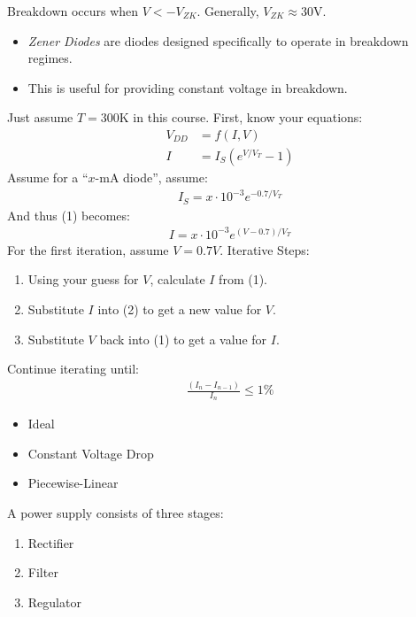 \documentclass{article}
\begin{document}
 Breakdown occurs when $V < -V_{ZK}$. Generally,
$V_{ZK} \approx 30$V.
\begin{itemize}
\item \textit{Zener Diodes} are diodes designed specifically to operate in breakdown
  regimes.
\item This is useful for providing constant voltage in breakdown.
\end{itemize}
 Just assume $T = 300$K in this course.
\gap
{}
First, know your equations:
\begin{align}
  V_{DD} &= f(I, V)\\
  I &= I_S(e^{V/V_T} - 1)
\end{align}
Assume for a ``$x$-mA diode'', assume:
\begin{align*}
  I_S = x \cdot 10^{-3} e^{-0.7/V_T}
\end{align*}
And thus (1) becomes:
\begin{align*}
  I = x \cdot 10^{-3}e^{(V- 0.7) / V_T}
\end{align*}
For the first iteration, assume $V = 0.7V$.
\gap
Iterative Steps:
\begin{enumerate}
\item Using your guess for $V$, calculate $I$ from (1).
\item Substitute $I$ into (2) to get a new value for $V$.
\item Substitute $V$ back into (1) to get a value for $I$.
\end{enumerate}
Continue iterating until:
\begin{align*}
  \frac{(I_n - I_{n - 1})}{I_n} \leq 1\%
\end{align*}
\begin{itemize}
\item Ideal
\item Constant Voltage Drop
\item Piecewise-Linear
\end{itemize}

\clearpage


 A power supply consists of three stages:
\begin{enumerate}
\item Rectifier
\item Filter
\item Regulator
\end{enumerate}
\end{document}
